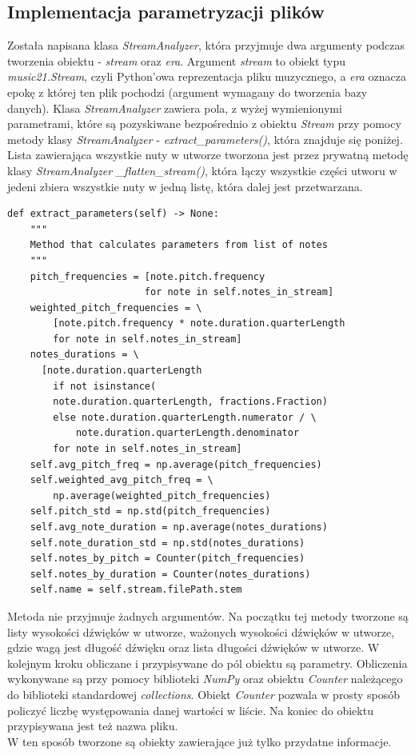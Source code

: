 \documentclass[printmode, eng, openany]{mgr}
\newcommand\tab[1][1cm]{\hspace*{#1}}
\begin{document}
\subsection{Implementacja parametryzacji plików}
\tab Została napisana klasa \textit{StreamAnalyzer}, która przyjmuje dwa argumenty podczas tworzenia obiektu - \textit{stream} oraz \textit{era}. Argument \textit{stream} to obiekt typu \textit{music21.Stream}, czyli Python'owa reprezentacja pliku muzycznego, a \textit{era} oznacza epokę z której ten plik pochodzi (argument wymagany do tworzenia bazy danych). Klasa \textit{StreamAnalyzer} zawiera pola, z wyżej wymienionymi parametrami, które są pozyskiwane bezpośrednio z obiektu \textit{Stream} przy pomocy metody klasy \textit{StreamAnalyzer} - \textit{extract\_parameters()}, która znajduje się poniżej.\\
\tab Lista zawierająca wszystkie nuty w utworze tworzona jest przez prywatną metodę klasy \textit{StreamAnalyzer} \textit{\_flatten\_stream()}, która łączy wszystkie części utworu w jeden\linebreak i zbiera wszystkie nuty w jedną listę, która dalej jest przetwarzana.
\begin{lstlisting}
def extract_parameters(self) -> None:
    """
    Method that calculates parameters from list of notes
    """
    pitch_frequencies = [note.pitch.frequency
                        for note in self.notes_in_stream]
    weighted_pitch_frequencies = \
    	[note.pitch.frequency * note.duration.quarterLength
        for note in self.notes_in_stream]
    notes_durations = \
      [note.duration.quarterLength
        if not isinstance(
        note.duration.quarterLength, fractions.Fraction)
        else note.duration.quarterLength.numerator / \
            note.duration.quarterLength.denominator
        for note in self.notes_in_stream]
    self.avg_pitch_freq = np.average(pitch_frequencies)
    self.weighted_avg_pitch_freq = \
        np.average(weighted_pitch_frequencies)
    self.pitch_std = np.std(pitch_frequencies)
    self.avg_note_duration = np.average(notes_durations)
    self.note_duration_std = np.std(notes_durations)
    self.notes_by_pitch = Counter(pitch_frequencies)
    self.notes_by_duration = Counter(notes_durations)
    self.name = self.stream.filePath.stem
\end{lstlisting}
\tab Metoda nie przyjmuje żadnych argumentów. Na początku tej metody tworzone są listy wysokości dźwięków w utworze, ważonych wysokości dźwięków w utworze, gdzie wagą jest długość dźwięku oraz lista długości dźwięków w utworze. W kolejnym kroku obliczane i przypisywane do pól obiektu są parametry. Obliczenia wykonywane są przy pomocy biblioteki \textit{NumPy} oraz obiektu \textit{Counter} należącego do biblioteki standardowej \textit{collections}. Obiekt \textit{Counter} pozwala w prosty sposób policzyć liczbę występowania danej wartości w liście. Na koniec do obiektu przypisywana jest też nazwa pliku.\\
\tab W ten sposób tworzone są obiekty zawierające już tylko przydatne informacje. 
\end{document}
